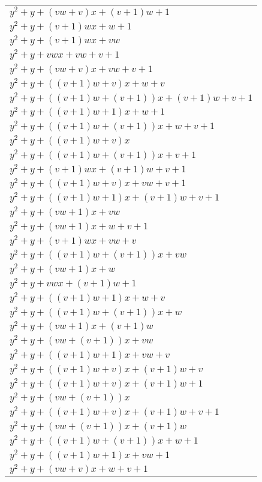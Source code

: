 \begin{center}
\begin{longtable}{|l|}
	$y^2 + y + (vw + v)x + (v + 1)w + 1$ \\
	$y^2 + y + (v + 1)wx + w + 1$ \\
	$y^2 + y + (v + 1)wx + vw$ \\
	$y^2 + y + vwx + vw + v + 1$ \\
	$y^2 + y + (vw + v)x + vw + v + 1$ \\
	$y^2 + y + ((v + 1)w + v)x + w + v$ \\
	$y^2 + y + ((v + 1)w + (v + 1))x + (v + 1)w + v + 1$ \\
	$y^2 + y + ((v + 1)w + 1)x + w + 1$ \\
	$y^2 + y + ((v + 1)w + (v + 1))x + w + v + 1$ \\
	$y^2 + y + ((v + 1)w + v)x$ \\
	$y^2 + y + ((v + 1)w + (v + 1))x + v + 1$ \\
	$y^2 + y + (v + 1)wx + (v + 1)w + v + 1$ \\
	$y^2 + y + ((v + 1)w + v)x + vw + v + 1$ \\
	$y^2 + y + ((v + 1)w + 1)x + (v + 1)w + v + 1$ \\
	$y^2 + y + (vw + 1)x + vw$ \\
	$y^2 + y + (vw + 1)x + w + v + 1$ \\
	$y^2 + y + (v + 1)wx + vw + v$ \\
	$y^2 + y + ((v + 1)w + (v + 1))x + vw$ \\
	$y^2 + y + (vw + 1)x + w$ \\
	$y^2 + y + vwx + (v + 1)w + 1$ \\
	$y^2 + y + ((v + 1)w + 1)x + w + v$ \\
	$y^2 + y + ((v + 1)w + (v + 1))x + w$ \\
	$y^2 + y + (vw + 1)x + (v + 1)w$ \\
	$y^2 + y + (vw + (v + 1))x + vw$ \\
	$y^2 + y + ((v + 1)w + 1)x + vw + v$ \\
	$y^2 + y + ((v + 1)w + v)x + (v + 1)w + v$ \\
	$y^2 + y + ((v + 1)w + v)x + (v + 1)w + 1$ \\
	$y^2 + y + (vw + (v + 1))x$ \\
	$y^2 + y + ((v + 1)w + v)x + (v + 1)w + v + 1$ \\
	$y^2 + y + (vw + (v + 1))x + (v + 1)w$ \\
	$y^2 + y + ((v + 1)w + (v + 1))x + w + 1$ \\
	$y^2 + y + ((v + 1)w + 1)x + vw + 1$ \\
	$y^2 + y + (vw + v)x + w + v + 1$ \\

\end{longtable}
\end{center}

